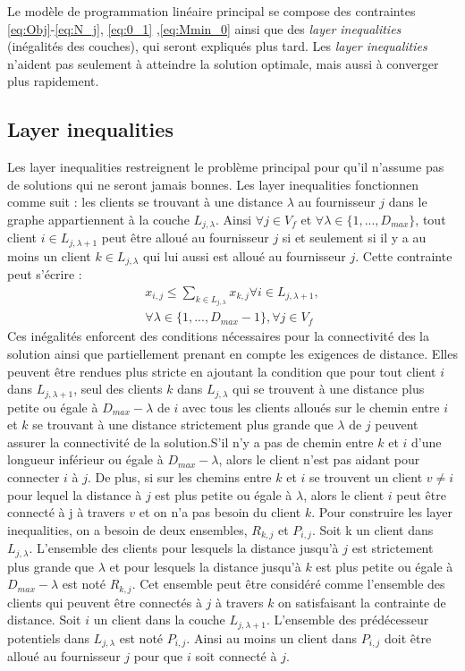 \documentclass[12pt,a4paper]{article}
\begin{document}
\begin{multicols}{2}
Le modèle de programmation linéaire principal se compose des contraintes \eqref{eq:Obj}-\eqref{eq:N_j}, \eqref{eq:0_1} ,\eqref{eq:Mmin_0} ainsi que des \textit{layer inequalities} (inégalités des couches), qui seront expliqués plus tard. Les \textit{layer inequalities} n'aident pas seulement à atteindre la solution optimale, mais aussi à converger plus rapidement.
\subsection{Layer inequalities}
Les layer inequalities restreignent le problème principal pour qu'il n'assume pas de solutions qui ne seront jamais bonnes. Les layer inequalities fonctionnen comme suit : les clients se trouvant à une distance $\lambda$ au fournisseur $j$ dans le graphe appartiennent à la couche $L_{j,\lambda}$. Ainsi $\forall j \in V_{f}$ et $\forall \lambda \in \{1,...,D_{max} \}$, tout client $i \in L_{j,\lambda + 1}$ peut être alloué au fournisseur $j$ si et seulement si il y a au moins un client $k \in L_{j,\lambda}$ qui lui aussi est alloué au fournisseur $j$. Cette contrainte peut s'écrire : 
\begin{align*}
x_{i,j} \leq \sum_{k \in L_{j,\lambda} }{x_{k,j}} \forall i \in L_{j,\lambda +1},\\ \forall \lambda \in \{ 1,...,D_{max}-1 \}, \forall j \in V_{f}
\end{align*}
Ces inégalités enforcent des conditions nécessaires pour la connectivité des la solution ainsi que partiellement prenant en compte les exigences de distance. Elles peuvent être rendues plus stricte en ajoutant la condition que pour tout client $i$ dans $L_{j,\lambda +1}$, seul des clients $k$ dans $L_{j,\lambda}$ qui se trouvent à une distance plus petite ou égale à $D_{max}-\lambda$ de $i$ avec tous les clients alloués sur le chemin entre $i$ et $k$ se trouvant à une distance strictement plus grande que $\lambda$ de $j$ peuvent assurer la connectivité de la solution.S'il n'y a pas de chemin entre $k$ et $i$ d'une longueur inférieur ou égale à $D_{max}-\lambda$, alors le client n'est pas aidant pour connecter $i$ à $j$. De plus, si sur les chemins entre $k$ et $i$ se trouvent un client $v \neq i$ pour lequel la distance à $j$ est plus petite ou égale à $\lambda$, alors le client $i$ peut être connecté à j à travers $v$ et on n'a pas besoin du client $k$.\newline \indent
Pour construire les layer inequalities, on a besoin de deux ensembles, $R_{k,j}$ et $P_{i,j}$. Soit k un client dans $L_{j,\lambda}$. L'ensemble des clients pour lesquels la distance jusqu'à $j$ est strictement plus grande que $\lambda$ et pour lesquels la distance jusqu'à $k$ est plus petite ou égale à $D_{max}-\lambda$ est noté $R_{k,j}$. Cet ensemble peut être considéré comme l'ensemble des clients qui peuvent être connectés à $j$ à travers $k$ on satisfaisant la contrainte de distance. Soit $i$ un client dans la couche $L_{j,\lambda +1}$. L'ensemble des prédécesseur potentiels dans $L_{j,\lambda}$ est noté $P_{i,j}$. Ainsi au moins un client dans $P_{i,j}$ doit être alloué au fournisseur $j$ pour que $i$ soit connecté à $j$.\newline\indent

\end{multicols}
\end{document}
